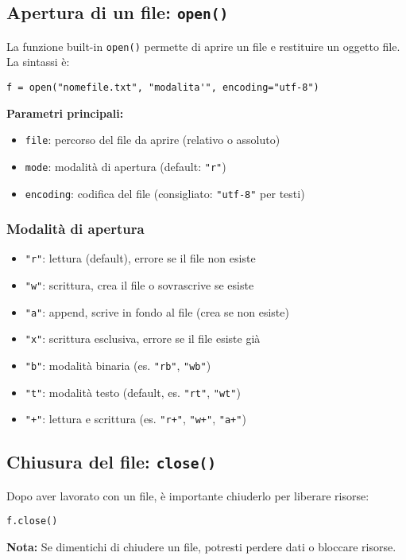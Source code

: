 \documentclass[a4paper,12pt]{article}
\begin{document}
\subsection*{Apertura di un file: \texttt{open()}}
La funzione built-in \texttt{open()} permette di aprire un file e restituire un oggetto file. La sintassi è:
\begin{lstlisting}
f = open("nomefile.txt", "modalita'", encoding="utf-8")
\end{lstlisting}
\textbf{Parametri principali:}
\begin{itemize}
    \item \texttt{file}: percorso del file da aprire (relativo o assoluto)
    \item \texttt{mode}: modalità di apertura (default: \texttt{"r"})
    \item \texttt{encoding}: codifica del file (consigliato: \texttt{"utf-8"} per testi)
\end{itemize}

\subsubsection*{Modalità di apertura}
\begin{itemize}
    \item \texttt{"r"}: lettura (default), errore se il file non esiste
    \item \texttt{"w"}: scrittura, crea il file o sovrascrive se esiste
    \item \texttt{"a"}: append, scrive in fondo al file (crea se non esiste)
    \item \texttt{"x"}: scrittura esclusiva, errore se il file esiste già
    \item \texttt{"b"}: modalità binaria (es. \texttt{"rb"}, \texttt{"wb"})
    \item \texttt{"t"}: modalità testo (default, es. \texttt{"rt"}, \texttt{"wt"})
    \item \texttt{"+"}: lettura e scrittura (es. \texttt{"r+"}, \texttt{"w+"}, \texttt{"a+"})
\end{itemize}

\subsection*{Chiusura del file: \texttt{close()}}
Dopo aver lavorato con un file, è importante chiuderlo per liberare risorse:
\begin{lstlisting}
f.close()
\end{lstlisting}
\textbf{Nota:} Se dimentichi di chiudere un file, potresti perdere dati o bloccare risorse.
\end{document}
